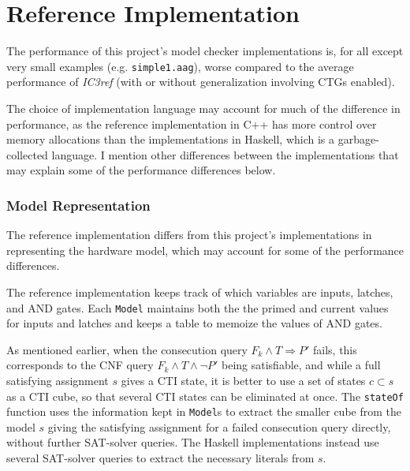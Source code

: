 \documentclass[12pt,a4paper,twoside,openright]{report}
\begin{document}
{\section{Reference Implementation}
\label{eval:ic3ref}

The performance of this project's model checker implementations is, for all except very small examples
(e.g. \verb,simple1.aag,),
worse compared to the average performance of \emph{IC3ref}
(with or without generalization involving CTGs enabled).

The choice of implementation language may account for much of the difference in performance, as the reference
implementation in C++ has more control over memory allocations than the implementations in Haskell, which is
a garbage-collected language. I mention other differences between the implementations that may explain
some of the performance differences below.

\subsubsection{Model Representation}
The reference implementation differs from this project's implementations in representing the hardware model,
which may account for some of the performance differences.

The reference implementation keeps track of which variables are inputs, latches, and AND gates.
Each \verb,Model, maintains both the the primed and current values for inputs and latches and keeps a
table to memoize the values of AND gates.


As mentioned earlier, when the consecution query $F_k \wedge T \Rightarrow P'$ fails, this corresponds
to the CNF query $F_k \wedge T \wedge \neg P'$ being satisfiable, and while a full satisfying assignment
$s$ gives a CTI state, it is better to use a set of states $c \subset s$ as a CTI cube, so that several
CTI states can be eliminated at once.
The \verb,stateOf, function uses the information kept in \verb,Model,s to extract the smaller
cube from the model $s$ giving the satisfying assignment for a failed consecution query directly,
without further SAT-solver queries.
The Haskell implementations instead use several SAT-solver queries to extract the necessary literals
from $s$.

}
\end{document}
